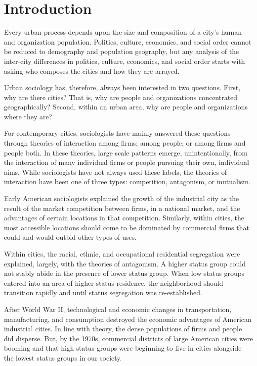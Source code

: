 \section{Introduction}
Every urban process depends upon the size and composition of a city's
human and organization population. Politics, culture,
economics, and social order cannot be reduced to demography and
population geography, but any analysis of the inter-city differences in
politics, culture, economics, and social order starts with asking who
composes the cities and how they are arrayed.

Urban sociology has, therefore, always been interested in two
questions. First, why are there cities? That is, why are people and
organizations concentrated geographically? Second, within an urban
area, why are people and organizations where they are?

For contemporary cities, sociologists have mainly answered these
questions through theories of interaction among firms; among people;
or among firms and people both. In these theories, large scale
patterns emerge, unintentionally, from the interaction of many
individual firms or people pursuing their own, individual aims.  While
sociologists have not always used these labels, the theories of
interaction have been one of three types: competition, antagonism, or
mutualism.

Early American sociologists explained the growth of the
industrial city as the result of the market competition between firms,
in a national market, and the advantages of certain locations in that
competition. Similarly, within cities, the most accessible locations
should come to be dominated by commercial firms that could and would
outbid other types of uses. 

Within cities, the racial, ethnic, and occupational residential
segregation were explained, largely, with the theories of
antagonism. A higher status group could not stably abide in the
presence of lower status group. When low status groups entered into an
area of higher status residence, the neighborhood should transition
rapidly and until status segregation was re-established.

After World War II, technological and economic changes in
transportation, manufacturing, and consumption destroyed the economic
advantages of American industrial cities. In line with theory, the
dense populations of firms and people did disperse. But, by the 1970s,
commercial districts of large American cities were booming and that
high status groups were beginning to live in cities alongside the
lowest status groups in our society. 

